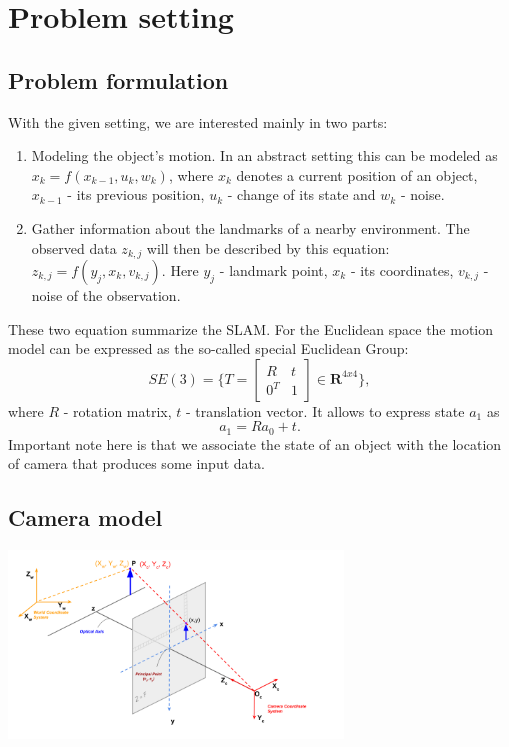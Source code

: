 \section{Problem setting}

\subsection{Problem formulation}

With the given setting, we are interested mainly in two parts:
\begin{enumerate}
    \item Modeling the object's motion. In an abstract setting this can be modeled as $x_{k} = f(x_{k - 1}, u_{k}, w_{k})$, where $x_{k}$ denotes a current position of an object, $x_{k - 1}$ - its previous position, $u_{k}$ - change of its state and $w_{k}$ - noise.  
    \item Gather information about the landmarks of a nearby environment. The observed data $z_{k, j}$ will then be described by this equation: $z_{k, j} = f(y_{j}, x_{k}, v_{k, j})$. Here $y_{j}$ - landmark point, $x_{k}$ - its coordinates, $v_{k, j}$ - noise of the observation.
\end{enumerate}

These two equation summarize the SLAM. For the Euclidean space the motion model can be expressed as the so-called special Euclidean Group: $$SE(3) = \{ T =
\begin{bmatrix}
    R    &  t      \\
    0^T  &  1      
\end{bmatrix} \in \mathbf{R}^{4x4} \},$$ where $R$ - rotation matrix, $t$ - translation vector. It allows to express state $a_{1}$ as $$a_{1} = R a_{0} + t.$$ Important note here is that we associate the state of an object with the location of camera that produces some input data.

\subsection{Camera model}

\begin{center}
    \includegraphics[height=5cm]{camera_model.png}
\end{center}

